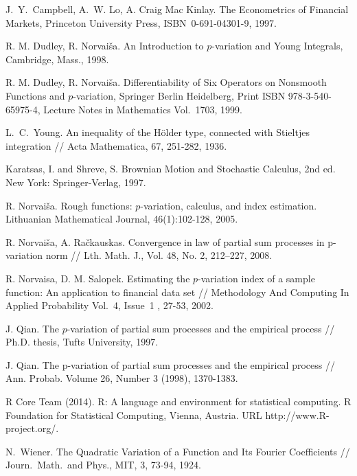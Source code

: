 \documentclass[12pt, a4paper]{article}
\numberwithin{equation}{section}
\begin{document}
\begin{thebibliography}{99}  

J.~Y.~Campbell, A.~W. Lo, A. Craig Mac Kinlay. The
Econometrics of Financial Markets, Princeton University Press, 
ISBN~0-691-04301-9, 1997.

R. M. Dudley, R. Norvai\v{s}a. An Introduction to
$p$-variation and Young Integrals, Cambridge, Mass., 1998.

R. M. Dudley, R. Norvai\v{s}a. Differentiability of 
Six Operators on Nonsmooth Functions and $p$-variation, 
Springer Berlin Heidelberg, 
Print ISBN 978-3-540-65975-4, Lecture Notes in Mathematics Vol.~1703, 1999.


L.~C.~Young. An inequality of the Hölder type, 
connected with Stieltjes integration
// Acta Mathematica, 67, 251-282, 1936.

Karatsas, I. and Shreve, S. Brownian Motion and Stochastic Calculus, 2nd ed. New York: Springer-Verlag, 1997. 

R. Norvaiša. Rough functions: $p$-variation, calculus, and index estimation. Lithuanian Mathematical Journal, 46(1):102-128, 2005.
  
R. Norvaiša, A. Račkauskas. Convergence in law of partial sum processes in p-variation norm // Lth. Math. J., Vol. 48, No. 2, 212–227, 2008.
  
R. Norvaisa, D. M. Salopek.
Estimating the $p$-variation index of a sample function: 
An application to financial data set //
Methodology And Computing In Applied Probability 
Vol.~4, Issue~1 , 27-53, 2002.   

J. Qian. The $p$-variation of partial sum processes and the empirical process // Ph.D. thesis, Tufts University, 1997.
  
J. Qian. The p-variation of partial sum processes and the empirical process // Ann. Probab. Volume 26, Number 3 (1998), 1370-1383.  
  
R Core Team (2014). R: A language and environment for
statistical computing. R Foundation for Statistical
Computing, Vienna, Austria. URL http://www.R-project.org/.
  
N.\ Wiener. The Quadratic Variation of a Function and 
Its Fourier Coefficients // 
Journ.\ Math.\ and Phys., MIT, 3, 73-94, 1924.

  
  
  
  
  
\end{thebibliography}
\end{document}
